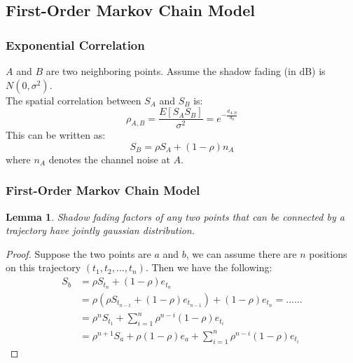 \documentclass{beamer}
\newtheorem{lem}[thm]{Lemma}
\begin{document}
\subsection{First-Order Markov Chain Model}
%
\begin{frame}
\frametitle{Exponential Correlation}
$A$ and $B$ are two neighboring points. Assume the shadow fading (in dB) is $N(0,\sigma^{2})$.\\
The spatial correlation between $S_{A}$ and $S_{B}$ is:
\begin{equation}
\rho_{A,B} = \frac{E[S_{A}S_{B}]}{\sigma^{2}}=e^{-\frac{d_{A,B}}{d_{0}}}
\end{equation}
This can be written as:
\begin{equation}
S_{B}=\rho S_{A}+(1-\rho)n_{A}
\end{equation}
where $n_{A}$ denotes the channel noise at $A$.
\end{frame}
%
\begin{frame}
\frametitle{First-Order Markov Chain Model}
\begin{lem}
Shadow fading factors of any two points that can be connected by a trajectory have jointly gaussian distribution.
\end{lem}
\begin{proof}Suppose the two points are $a$ and $b$, we can assume there are $n$ positions on this trajectory $(t_{1},t_{2},\dots,t_{n})$. Then we have the following:
\begin{equation}
\begin{split}
S_{b} &=\rho S_{t_{n}}+(1-\rho)e_{t_{n}}\\
&=\rho(\rho S_{t_{n-1}}+(1-\rho)e_{t_{n-1}})+(1-\rho)e_{t_{n}}=\ldots\ldots\\
&=\rho^{n}S_{t_{1}}+\sum_{i=1}^{n}\rho^{n-i}(1-\rho)e_{t_{i}}\\
&=\rho^{n+1}S_{a}+\rho(1-\rho)e_{a}+\sum_{i=1}^{n}\rho^{n-i}(1-\rho)e_{t_{i}}
\end{split}
\end{equation}
\end{proof}
\end{frame}
\end{document}
